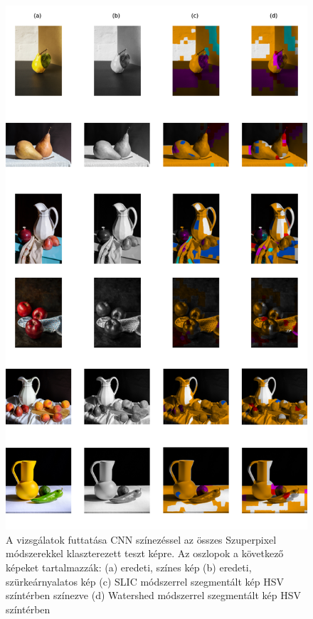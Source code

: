 \begin{figure}[h]
\centering
\includegraphics[scale=0.4]{images/result_all_superpixel.png}
\caption{A vizsgálatok futtatása CNN színezéssel az összes Szuperpixel módszerekkel klaszterezett teszt képre. Az oszlopok a következő képeket tartalmazzák: (a) eredeti, színes kép (b) eredeti, szürkeárnyalatos kép (c) SLIC módszerrel szegmentált kép HSV színtérben színezve (d) Watershed módszerrel szegmentált kép HSV színtérben}
\label{fig:result_all_superpixel}
\end{figure}

